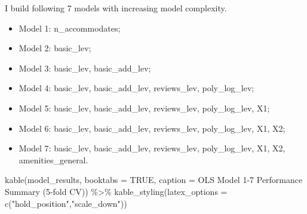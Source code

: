 \documentclass[
]{article}
\newenvironment{Shaded}{\begin{snugshade}}{\end{snugshade}}
\newcommand{\AttributeTok}[1]{\textcolor[rgb]{0.77,0.63,0.00}{#1}}
\newcommand{\ConstantTok}[1]{\textcolor[rgb]{0.00,0.00,0.00}{#1}}
\newcommand{\FunctionTok}[1]{\textcolor[rgb]{0.00,0.00,0.00}{#1}}
\newcommand{\NormalTok}[1]{#1}
\newcommand{\SpecialCharTok}[1]{\textcolor[rgb]{0.00,0.00,0.00}{#1}}
\newcommand{\StringTok}[1]{\textcolor[rgb]{0.31,0.60,0.02}{#1}}
\providecommand{\tightlist}{%
  \setlength{\itemsep}{0pt}\setlength{\parskip}{0pt}}
\begin{document}
I build following 7 models with increasing model complexity.

\begin{itemize}
\tightlist
\item
  Model 1: n\_accommodates;
\item
  Model 2: basic\_lev;
\item
  Model 3: basic\_lev, basic\_add\_lev;
\item
  Model 4: basic\_lev, basic\_add\_lev, reviews\_lev, poly\_log\_lev;
\item
  Model 5: basic\_lev, basic\_add\_lev, reviews\_lev, poly\_log\_lev,
  X1;
\item
  Model 6: basic\_lev, basic\_add\_lev, reviews\_lev, poly\_log\_lev,
  X1, X2;
\item
  Model 7: basic\_lev, basic\_add\_lev, reviews\_lev, poly\_log\_lev,
  X1, X2, amenities\_general.
\end{itemize}

\begin{Shaded}
\begin{Highlighting}[]
\FunctionTok{kable}\NormalTok{(model\_results, }\AttributeTok{booktabs =} \ConstantTok{TRUE}\NormalTok{, }\AttributeTok{caption =} \StringTok{\textquotesingle{}OLS Model 1{-}7 Performance Summary (5{-}fold CV)\textquotesingle{}}\NormalTok{) }\SpecialCharTok{\%\textgreater{}\%} \FunctionTok{kable\_styling}\NormalTok{(}\AttributeTok{latex\_options =} \FunctionTok{c}\NormalTok{(}\StringTok{"hold\_position"}\NormalTok{,}\StringTok{"scale\_down"}\NormalTok{))}
\end{Highlighting}
\end{Shaded}

\begin{table}[!h]

\caption{\label{tab:unnamed-chunk-9}OLS Model 1-7 Performance Summary (5-fold CV)}
\centering
{}
\end{table}
\end{document}
